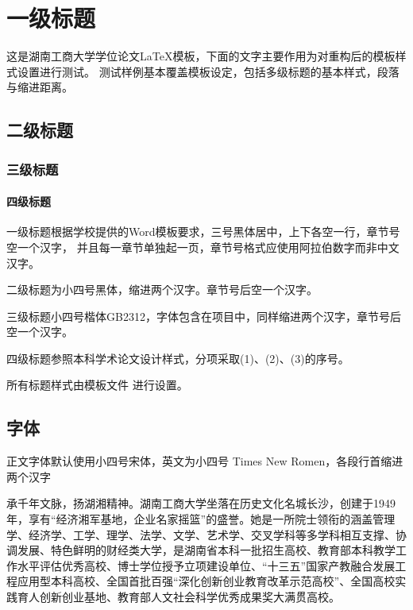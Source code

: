 \chapter{一级标题}

这是湖南工商大学学位论文\LaTeX{}模板，下面的文字主要作用为对重构后的模板样式设置进行测试。
测试样例基本覆盖模板设定，包括多级标题的基本样式，段落与缩进距离。

\section{二级标题}

\subsection{三级标题}

\subsubsection{四级标题}

一级标题根据学校提供的Word模板要求，三号黑体居中，上下各空一行，章节号空一个汉字，
并且每一章节单独起一页，章节号格式应使用阿拉伯数字而非中文汉字。

二级标题为小四号黑体，缩进两个汉字。章节号后空一个汉字。

三级标题小四号楷体GB2312，字体包含在项目中，同样缩进两个汉字，章节号后空一个汉字。

四级标题参照本科学术论文设计样式，分项采取(1)、(2)、(3)的序号。

所有标题样式由模板文件  进行设置。

\section{字体}

正文字体默认使用小四号宋体，英文为小四号 Times New Romen，各段行首缩进两个汉字

承千年文脉，扬湖湘精神。湖南工商大学坐落在历史文化名城长沙，创建于1949年，享有“经济湘军基地，企业名家摇篮”的盛誉。她是一所院士领衔的涵盖管理学、经济学、工学、理学、法学、文学、艺术学、交叉学科等多学科相互支撑、协调发展、特色鲜明的财经类大学，是湖南省本科一批招生高校、教育部本科教学工作水平评估优秀高校、博士学位授予立项建设单位、“十三五”国家产教融合发展工程应用型本科高校、全国首批百强“深化创新创业教育改革示范高校”、全国高校实践育人创新创业基地、教育部人文社会科学优秀成果奖大满贯高校。

